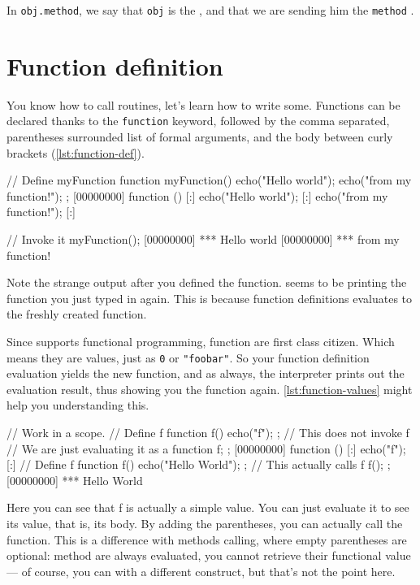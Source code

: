 In \lstinline|obj.method|, we say that \texttt{obj} is the
, and that we are sending him the \texttt{method}
.

\section{Function definition}

You know how to call routines, let's learn how to write
some. Functions can be declared thanks to the \texttt{function}
keyword, followed by the comma separated, parentheses surrounded list
of formal arguments, and the body between curly brackets (\autoref{lst:function-def}).

\begin{urbiscript}[caption=Defining a function,label=lst:function-def]
// Define myFunction
function myFunction()
{
  echo("Hello world");
  echo("from my function!");
};
[00000000] function () {
[:]  echo("Hello world");
[:]  echo("from my function!");
[:]}

// Invoke it
myFunction();
[00000000] *** Hello world
[00000000] *** from my function!
\end{urbiscript}

Note the strange output after you defined the function. \urbi seems to
be printing the function you just typed in again. This is because
function definitions evaluates to the freshly created function.

Since \urbi supports functional programming, function are first class
citizen. Which means they are values, just as \texttt{0} or
\texttt{"foobar"}. So your function definition evaluation yields the
new function, and as always, the interpreter prints out the evaluation
result, thus showing you the function again. \autoref{lst:function-values}
might help you understanding this.


\begin{urbiscript}[caption=Function as values,label=lst:function-values]
// Work in a scope.
{
  // Define f
  function f()
  {
    echo("f");
  };
  // This does not invoke f
  // We are just evaluating it as a function
  f;
};
[00000000] function () {
[:]  echo("f");
[:]}
{
  // Define f
  function f()
  {
    echo("Hello World");
  };
  // This actually calls f
  f();
};
[00000000] *** Hello World
\end{urbiscript}

Here you can see that f is actually a simple value. You can just
evaluate it to see its value, that is, its body. By adding the
parentheses, you can actually call the function. This is a difference
with methods calling, where empty parentheses are optional: method are
always evaluated, you cannot retrieve their functional value --- of
course, you can with a different construct, but that's not the point
here.

